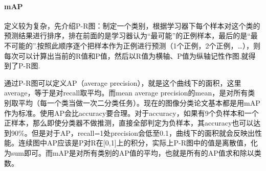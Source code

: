 \paragraph{mAP}定义较为复杂，先介绍P-R图：制定一个类别，根据学习器下每个样本对这个类的预测结果进行排序，排在前面的是学习器认为“最可能”的正例样本，最后的是“最不可能的”.按照此顺序逐个把样本作为正例进行预测（1个正例，2个正例，…），则每次可以计算出当前的R值和P值，然后以R值为横轴、P值为纵轴记性作图.就得到了P-R图. 

通过P-R图可以定义AP（average precision），就是这个曲线下的面积，这里average，等于是对recall取平均。而mean average precision的mean，是对所有类别取平均（每一个类当做一次二分类任务）。现在的图像分类论文基本都是用mAP作为标准。使用AP会比accuracy要合理。对于accuracy，如果有9个负样本和一个正样本，那么即使分类器不做推测，直接全部判定为负样本，其accuracy也可以达到90\%。但是对于AP，recall=1处precision会低至0.1，曲线下的面积就会反映出性能。连续图中AP应该是P对R在[0,1]上的积分，实际上P-R图中的值是离散值，化为sum即可。而mAP是对所有类别的AP值的平均，也就是所有的AP值求和除以类数。